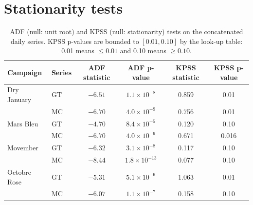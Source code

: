 \documentclass[11pt,a4paper]{article}
\begin{document}
\section{Stationarity tests}\label{app:stationarity}
\begin{table}[H]
\centering
\caption{ADF (null: unit root) and KPSS (null: stationarity) tests on the concatenated daily series. KPSS p-values are bounded to $[0.01, 0.10]$ by the look-up table: 0.01 means $\le 0.01$ and 0.10 means $\ge 0.10$.}
\small
\begin{tabular}{llcccc}
\toprule
Campaign & Series & ADF statistic & ADF p-value & KPSS statistic & KPSS p-value \\
\midrule
Dry January  & GT & $-6.51$ & $1.1\times10^{-8}$  & 0.859 & 0.01 \\
             & MC & $-6.70$ & $4.0\times10^{-9}$  & 0.756 & 0.01 \\
Mars Bleu    & GT & $-4.70$ & $8.4\times10^{-5}$  & 0.120 & 0.10 \\
             & MC & $-6.70$ & $4.0\times10^{-9}$  & 0.671 & 0.016 \\
Movember     & GT & $-6.32$ & $3.1\times10^{-8}$  & 0.117 & 0.10 \\
             & MC & $-8.44$ & $1.8\times10^{-13}$ & 0.077 & 0.10 \\
Octobre Rose & GT & $-5.31$ & $5.1\times10^{-6}$  & 1.063 & 0.01 \\
             & MC & $-6.07$ & $1.1\times10^{-7}$  & 0.158 & 0.10 \\
\bottomrule
\end{tabular}
\end{table}
\end{document}
